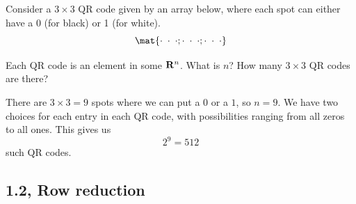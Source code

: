 \begin{problems}

\problem Consider a $3 \times 3$ QR code given by an array below,
where each spot can either have a 0 (for black) or 1 (for white).
\[\mat{\cdot \; \cdot \; \cdot;
    \cdot \; \cdot \; \cdot;
    \cdot \; \cdot \; \cdot}\]
\begin{subproblems}
  \subproblem Each QR code is an element in some ${\bf R}^n$.  What is
  $n$?
  \subproblem How many $3 \times 3$ QR codes are there?
\end{subproblems}

\begin{solution}
  \begin{subproblems}
    \subproblem There are $3\times 3 = 9$ spots where we can put a $0$
    or a $1$, so $n = 9$.  \subproblem We have two choices for each
    entry in each QR code, with possibilities ranging from all zeros
    to all ones.  This gives us \[2^9 = 512\] such QR codes.
  \end{subproblems}
\end{solution}

\end{problems}\setcounter{problem}{0}



%
%
\newpage
%
%

\subsection{1.2, Row reduction}

